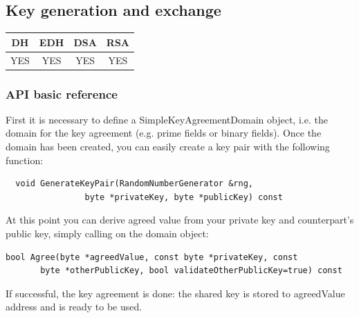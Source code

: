 \begin{center}
\end{center}

\newpage
\subsection{Key generation and exchange}
\begin{table}[!ht]
	\begin{tabular}{|| c | c | c | c ||}
		\textbf{DH} & \textbf{EDH} & \textbf{DSA} & \textbf{RSA} \\
		\hline \hline
		YES & YES & YES & YES \\
	\end{tabular}
\end{table}

\subsubsection*{API basic reference}
First it is necessary to define a SimpleKeyAgreementDomain object, i.e. the domain for the key agreement (e.g. prime fields or binary fields). Once the domain has been created, you can easily create a key pair with the following function:
\begin{verbatim}
  void GenerateKeyPair(RandomNumberGenerator &rng,
                byte *privateKey, byte *publicKey) const
\end{verbatim}
At this point you can derive agreed value from your private key and counterpart's public key, simply calling on the domain object:
\begin{verbatim}
bool Agree(byte *agreedValue, const byte *privateKey, const
       byte *otherPublicKey, bool validateOtherPublicKey=true) const
\end{verbatim}
If successful, the key agreement is done: the shared key is stored to agreedValue address and is ready to be used.
